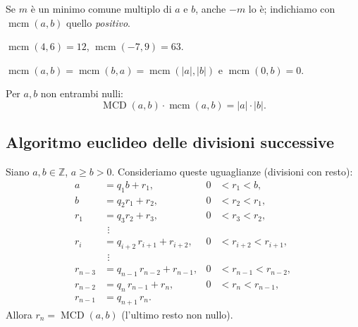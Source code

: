 \documentclass[11pt,a4paper]{article}
\begin{document}
Se $m$ è un minimo comune multiplo di $a$ e $b$, anche $-m$ lo è; indichiamo con $\operatorname{mcm}(a, b)$ quello \emph{positivo}.

\begin{esempio}
$\operatorname{mcm}(4, 6) = 12$, \quad $\operatorname{mcm}(-7, 9) = 63$.
\end{esempio}

\begin{proprieta}
$\operatorname{mcm}(a, b) = \operatorname{mcm}(b, a) = \operatorname{mcm}(|a|, |b|)$ e $\operatorname{mcm}(0, b) = 0$.
\end{proprieta}

\begin{proprieta}[Formula]
Per $a, b$ non entrambi nulli:
\[
  \operatorname{MCD}(a, b)\cdot\operatorname{mcm}(a, b) = |a|\cdot|b| .
\]
\end{proprieta}

\subsection{Algoritmo euclideo delle divisioni successive}

\begin{teorema}
Siano $a, b \in \mathbb{Z}$, $a \ge b > 0$. Consideriamo queste uguaglianze (divisioni con resto):
\begin{align*}
  a &= q_1 b + r_1, & 0 &< r_1 < b,\\
  b &= q_2 r_1 + r_2, & 0 &< r_2 < r_1,\\
  r_1 &= q_3 r_2 + r_3, & 0 &< r_3 < r_2,\\
  &\ \,\vdots\\
  r_i &= q_{i+2}\, r_{i+1} + r_{i+2}, & 0 &< r_{i+2} < r_{i+1},\\
  &\ \,\vdots\\
  r_{n-3} &= q_{n-1}\, r_{n-2} + r_{n-1}, & 0 &< r_{n-1} < r_{n-2},\\
  r_{n-2} &= q_n\, r_{n-1} + r_n, & 0 &< r_n < r_{n-1},\\
  r_{n-1} &= q_{n+1}\, r_n .
\end{align*}
Allora $r_n = \operatorname{MCD}(a, b)$ (l'ultimo resto non nullo).
\end{teorema}
\end{document}
